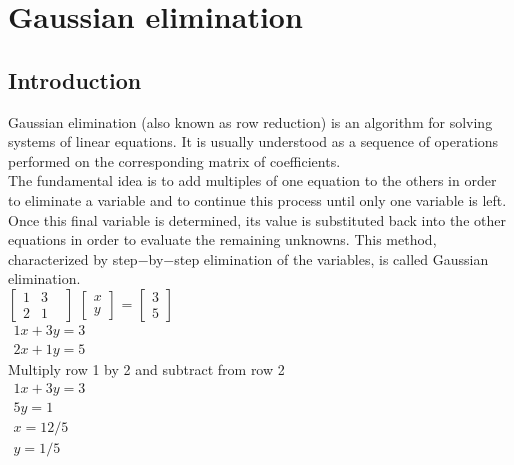\chapter{Gaussian elimination}

\section{Introduction}
Gaussian elimination (also known as row reduction) is an algorithm for solving systems of linear equations. It is usually understood as a sequence of operations performed on the corresponding matrix of coefficients. \\
The fundamental idea is to add multiples of one equation to the others in order to eliminate a variable and to continue this process until only one variable is left. Once this final variable is determined, its value is substituted back into the other equations in order to evaluate the remaining unknowns. This method, characterized by step$-$by$-$step  elimination of the variables, is called Gaussian elimination.\\
$\begin{bmatrix}
1&3& \\
2&1&				
\end{bmatrix}$
$\begin{bmatrix}
x \\
y				
\end{bmatrix}$
=
$\begin{bmatrix}
3 \\
5				
\end{bmatrix}$\\

$\begin{matrix}
1x+3y = 3 \\
2x+1y = 5				
\end{matrix}$\\

Multiply row 1 by 2 and subtract from row 2 \\
$\begin{matrix}
1x+3y = 3 \\
5y = 1				
\end{matrix}$\\
$\begin{matrix}
x = 12/5 \\
y = 1/5				
\end{matrix}$
